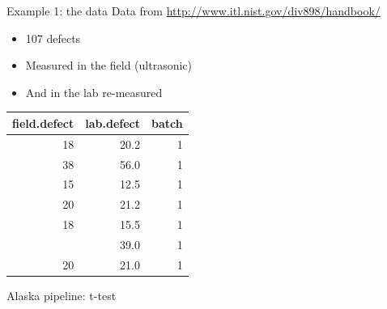 \documentclass[
  ignorenonframetext,
]{beamer}
\newenvironment{Shaded}{\begin{snugshade}}{\end{snugshade}}
\newcommand{\AttributeTok}[1]{\textcolor[rgb]{0.13,0.29,0.53}{#1}}
\newcommand{\ConstantTok}[1]{\textcolor[rgb]{0.56,0.35,0.01}{#1}}
\newcommand{\FunctionTok}[1]{\textcolor[rgb]{0.13,0.29,0.53}{\textbf{#1}}}
\newcommand{\NormalTok}[1]{#1}
\newcommand{\SpecialCharTok}[1]{\textcolor[rgb]{0.81,0.36,0.00}{\textbf{#1}}}
\providecommand{\tightlist}{%
  \setlength{\itemsep}{0pt}\setlength{\parskip}{0pt}}
\begin{document}
\begin{frame}{Example 1: the data}
\label{example-1-the-data}
Data from \url{http://www.itl.nist.gov/div898/handbook/}

\begin{itemize}
\tightlist
\item
  107 defects
\item
  Measured in the field (ultrasonic)
\item
  And in the lab re-measured
\end{itemize}

\tiny

\begin{codebox}

\begin{table}
\centering
\begin{tabular}{rrr}
\toprule
field.defect & lab.defect & batch\\
\midrule
18 & 20.2 & 1\\
38 & 56.0 & 1\\
15 & 12.5 & 1\\
20 & 21.2 & 1\\
18 & 15.5 & 1\\
\addlinespace
36 & 39.0 & 1\\
20 & 21.0 & 1\\
\bottomrule
\end{tabular}
\end{table}

\end{codebox}

\normalsize
\end{frame}

\begin{frame}[fragile]{Alaska pipeline: t-test}
\label{alaska-pipeline-t-test}
\begin{codebox}

\begin{Shaded}
\end{Shaded}

\end{codebox}
\end{frame}
\end{document}
